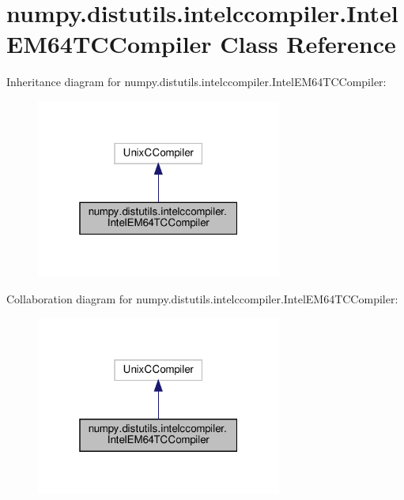 \hypertarget{classnumpy_1_1distutils_1_1intelccompiler_1_1IntelEM64TCCompiler}{}\section{numpy.\+distutils.\+intelccompiler.\+Intel\+E\+M64\+T\+C\+Compiler Class Reference}
\label{classnumpy_1_1distutils_1_1intelccompiler_1_1IntelEM64TCCompiler}


Inheritance diagram for numpy.\+distutils.\+intelccompiler.\+Intel\+E\+M64\+T\+C\+Compiler\+:
\nopagebreak
\begin{figure}[H]
\begin{center}
\leavevmode
\includegraphics[width=229pt]{classnumpy_1_1distutils_1_1intelccompiler_1_1IntelEM64TCCompiler__inherit__graph}
\end{center}
\end{figure}


Collaboration diagram for numpy.\+distutils.\+intelccompiler.\+Intel\+E\+M64\+T\+C\+Compiler\+:
\nopagebreak
\begin{figure}[H]
\begin{center}
\leavevmode
\includegraphics[width=229pt]{classnumpy_1_1distutils_1_1intelccompiler_1_1IntelEM64TCCompiler__coll__graph}
\end{center}
\end{figure}
